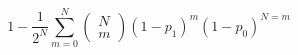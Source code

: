   \begin{equation}
    1-\frac{1}{2^N}\sum_{m=0}^N\left(\begin{array}{l}N\\m\end{array}\right)\left(1-p_1\right)^m\left(1-p_0\right)^{N=m}
    \label{eq:aveMIR}
  \end{equation}
